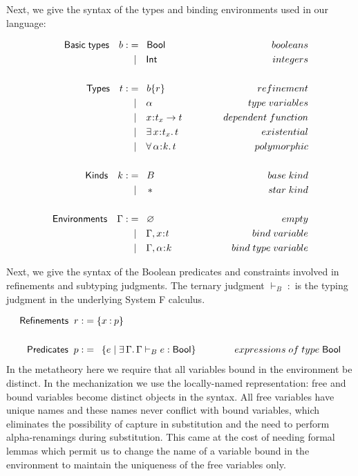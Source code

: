 \documentclass[11pt]{article}
\newcommand{\al}{\alpha}
\newcommand{\bind}{\hspace{0.05em}{:}\hspace{0.05em}} %
\newcommand{\col}{\mathbin{:}}       %
\begin{document}
Next, we give the syntax of the types and binding environments used in our language:

\begin{align*}
{\sf Basic\; types} \quad b :&=\;\;{\sf Bool}{\kern 5em}&booleans\\
                   &\;\;|\quad {\sf Int} &integers \\ \\
{\sf Types} \quad t :&=\;\; b\{r\} & refinement \\
                   &\;\;|\quad \al &type\; variables \\
                   &\;\;|\quad x\bind t_x \rightarrow t 
                   &dependent\; function\\
                   &\;\;|\quad \exists\, x\bind t_x.\, t 
                   &existential\\ 
                   &\;\;|\quad \forall\, \al\bind k.\, t
                   &polymorphic\\ \\
{\sf Kinds} \quad k :&= \;\; B &base\; kind \\
                   &\;\;|\quad\, * &star\; kind \\ \\
{\sf Environments} \quad \Gamma :&=\;\; \varnothing
                   {\kern 5em}& empty \\
                   &\;\;|\quad \Gamma, x\bind t & bind\;variable\\
                   &\;\;|\quad \Gamma, \al\bind k & bind\;type\;variable\\
\end{align*}

Next, we give the syntax of the Boolean predicates and constraints involved in refinements and subtyping judgments. The ternary judgment $\vdash_B \; :$ is the typing judgment in the underlying System F calculus.

\begin{align*}
{\sf Refinements} \;\; r :&= \{x\col p\}  \\ \\
{\sf Predicates} \;\; p :&=\;\: \{ e \;|\; \exists\, \Gamma.\, 
                   \Gamma \vdash_B e : {\sf Bool}\}
                   {\kern 3 em}& expressions\; of\; type\; {\sf Bool} 
\end{align*}
In the metatheory here we require that all variables bound in the environment be distinct. In the mechanization we use the locally-named representation: free and bound variables become distinct objects in the syntax. All free variables have unique names and these names never conflict with bound variables, which eliminates the possibility of capture in substitution and the need to perform alpha-renamings during substitution. This came at the cost of needing formal lemmas which permit us to change the name of a variable bound in the environment to maintain the uniqueness of the free variables only.
\end{document}

